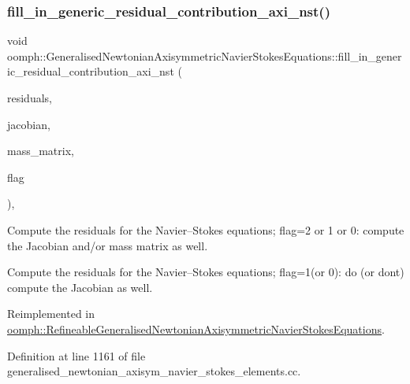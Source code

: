 \subsubsection{\texorpdfstring{fill\+\_\+in\+\_\+generic\+\_\+residual\+\_\+contribution\+\_\+axi\+\_\+nst()}{fill\_in\_generic\_residual\_contribution\_axi\_nst()}}
{\footnotesize\ttfamily void oomph\+::\+Generalised\+Newtonian\+Axisymmetric\+Navier\+Stokes\+Equations\+::fill\+\_\+in\+\_\+generic\+\_\+residual\+\_\+contribution\+\_\+axi\+\_\+nst (\begin{DoxyParamCaption}\item[{\hyperlink{classoomph_1_1Vector}{Vector}$<$ double $>$ \&}]{residuals,  }\item[{\hyperlink{classoomph_1_1DenseMatrix}{Dense\+Matrix}$<$ double $>$ \&}]{jacobian,  }\item[{\hyperlink{classoomph_1_1DenseMatrix}{Dense\+Matrix}$<$ double $>$ \&}]{mass\+\_\+matrix,  }\item[{unsigned}]{flag }\end{DoxyParamCaption})\hspace{0.3cm}{\ttfamily [protected]}, {\ttfamily [virtual]}}



Compute the residuals for the Navier--Stokes equations; flag=2 or 1 or 0\+: compute the Jacobian and/or mass matrix as well. 

Compute the residuals for the Navier--Stokes equations; flag=1(or 0)\+: do (or don\textquotesingle{}t) compute the Jacobian as well. 

Reimplemented in \hyperlink{classoomph_1_1RefineableGeneralisedNewtonianAxisymmetricNavierStokesEquations_a2db17023f544958a02c0c787da9020df}{oomph\+::\+Refineable\+Generalised\+Newtonian\+Axisymmetric\+Navier\+Stokes\+Equations}.



Definition at line 1161 of file generalised\+\_\+newtonian\+\_\+axisym\+\_\+navier\+\_\+stokes\+\_\+elements.\+cc.



